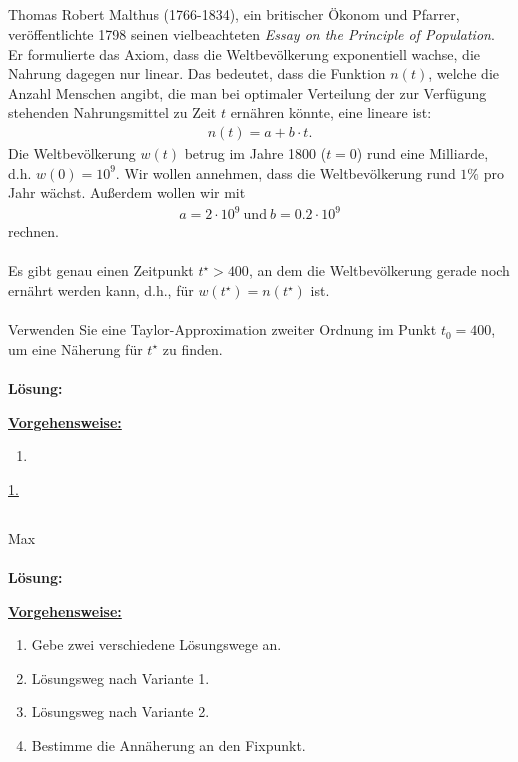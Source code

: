  


\newpage

\subsection*{}
Thomas Robert Malthus (1766-1834), ein britischer Ökonom und Pfarrer, veröffentlichte
1798 seinen vielbeachteten \textit{Essay on the Principle of Population}.
Er formulierte das Axiom, dass die Weltbevölkerung exponentiell wachse, die Nahrung dagegen nur linear. 
Das bedeutet, dass die Funktion $ n(t) $, welche die Anzahl Menschen angibt, die man bei optimaler Verteilung der zur Verfügung stehenden Nahrungsmittel zu Zeit $ t $ ernähren könnte, eine lineare ist:
\begin{align*}
	n(t) = a + b \cdot t.
\end{align*}
Die Weltbevölkerung $ w(t) $ betrug im Jahre 1800 ($ t= 0 $) rund eine Milliarde, d.h. $ w(0) = 10^9 $.
Wir wollen annehmen, dass die Weltbevölkerung rund $ 1\% $ pro Jahr wächst.
Außerdem wollen wir mit
\begin{align*}
	a = 2 \cdot 10^9 \ \textrm{und} \ b = 0.2 \cdot 10^9
\end{align*}
rechnen.\\
\\
Es gibt genau einen Zeitpunkt $ t^\star > 400 $, an dem die Weltbevölkerung gerade noch ernährt werden kann, d.h., für $ w(t^\star)  = n(t^\star )$ ist.\\
\\
Verwenden Sie eine Taylor-Approximation zweiter Ordnung im Punkt $ t_0 = 400 $, um eine Näherung für $ t^\star $ zu finden.
\\ \\
\textbf{Lösung:}
\begin{mdframed}
\underline{\textbf{Vorgehensweise:}}
\renewcommand{\labelenumi}{\theenumi.}
\begin{enumerate}
\item 
\end{enumerate}
\end{mdframed}

\underline{1. }\\


\newpage
\subsection*{}
Max
\\ \\
\textbf{Lösung:}
\begin{mdframed}
\underline{\textbf{Vorgehensweise:}}
\begin{enumerate}
\item Gebe zwei verschiedene Lösungswege an.
\item Lösungsweg nach Variante 1.
\item Lösungsweg nach Variante 2.
\item Bestimme die Annäherung an den Fixpunkt.
\end{enumerate}
\end{mdframed}

